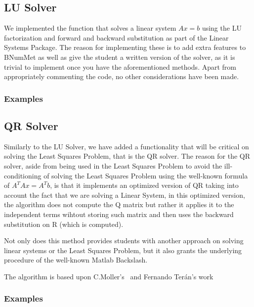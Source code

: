 \subsection{LU Solver}
We implemented the function that solves a linear system $Ax=b$ using the LU factorization and forward and backward substitution as part of the Linear Systems Package. The reason for implementing these is to add extra features to BNumMet as well as give the student a written version of the solver, as it is trivial to implement once you have the aforementioned methods. Apart from appropriately commenting the code, no other considerations have been made.
\subsubsection{Examples}
	

\subsection{QR Solver}
Similarly to the LU Solver, we have added a functionality that will be critical on solving the Least Squares Problem, that is the QR solver. The reason for the QR solver, aside from being used in the Least Squares Problem to avoid the ill-conditioning of solving the Least Squares Problem using the well-known formula of $A^T A x= A^T b$, is that it implements an optimized version of QR taking into account the fact that we are solving a Linear System, in this optimized version, the algorithm does not compute the Q matrix but rather it applies it to the independent terms wihtout storing such matrix and then uses the backward substitution on R (which is computed).

Not only does this method provides students with another approach on solving linear systems or the Least Squares Problem, but it also grants the underlying procedure of the well-known Matlab Backslash.

The algorithm is based upon C.Moller's~\cite{doi:10.1137/1.9780898717952} and Fernando Terán's work~\cite{Vergara}
\subsubsection{Examples}



